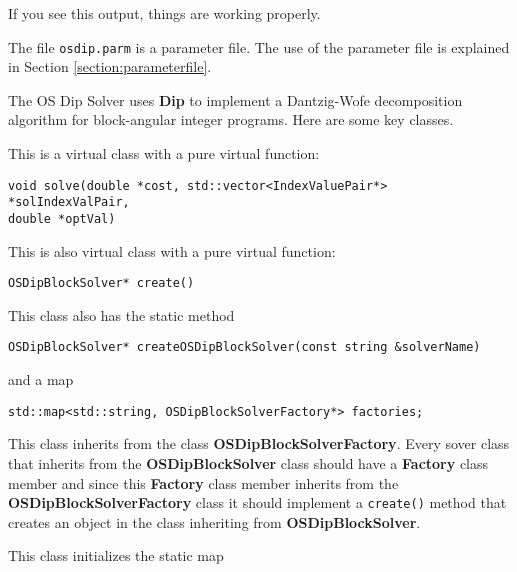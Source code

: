 If you see this output,  things are working properly. 

The file
{\tt osdip.parm} is a parameter file. The use of the parameter file is 
explained in Section \ref{section:parameterfile}.


\label{section:osdipsolver}

The OS Dip Solver uses {\bf Dip} to implement a Dantzig-Wofe decomposition
algorithm for block-angular integer programs. Here are some key classes.




\vskip 8pt
  This is a virtual class with a pure virtual
function: 

\begin{verbatim}
void solve(double *cost, std::vector<IndexValuePair*> *solIndexValPair,
double *optVal)
\end{verbatim}



\vskip 8pt
  This is also virtual class with a pure
virtual function: 

\begin{verbatim}
OSDipBlockSolver* create()
\end{verbatim}

This class also has the static method

\begin{verbatim}
OSDipBlockSolver* createOSDipBlockSolver(const string &solverName)
\end{verbatim}

and a map

\begin{verbatim}
std::map<std::string, OSDipBlockSolverFactory*> factories;
\end{verbatim}


\vskip 8pt
  This class inherits from the class {\bf
OSDipBlockSolverFactory}. Every sover class that inherits from the  {\bf
OSDipBlockSolver} class should have a {\bf Factory} class member and since
this {\bf Factory} class member inherits from the {\bf
OSDipBlockSolverFactory} class it should implement a {\tt create()} method that
creates an object in the class inheriting from {\bf
OSDipBlockSolver}.

\vskip 8pt
  This class initializes the static map

